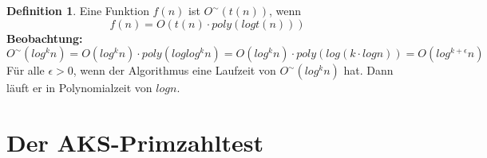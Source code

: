 \documentclass[12pt,oneside]{article}
\theoremstyle{remark}
\theoremstyle{definition}
\newtheorem{definition}{Definition}[section]
\begin{document}
\begin{definition}
Eine Funktion $f(n)$ ist $ O^{\sim}(t(n))$, wenn
\begin{equation}
    f(n) = O(t(n) \cdot poly(log t(n)))
\end{equation}
\textbf{Beobachtung:}
\begin{equation}
    O^{\sim}(log^k n) = O(log^k n) \cdot poly(log log^k n) = O(log^k n) \cdot poly(log( k \cdot log n)) = O(log^{k+\epsilon}n)
\end{equation}
Für alle $\epsilon > 0$, wenn der Algorithmus eine Laufzeit von $O^{\sim}(log^k n)$ hat. Dann läuft er in Polynomialzeit von $log n$.
\end{definition}



\section{Der AKS-Primzahltest}
\end{document}
